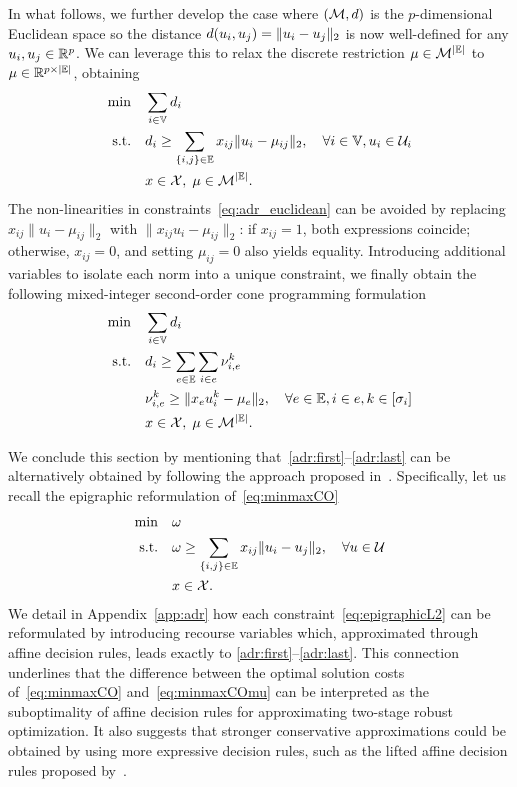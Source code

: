 \documentclass[12pt]{article}
\begin{document}
In what follows, we further develop the case where $(\mathcal{M},d)$ is the $p$-dimensional Euclidean space so the distance $d(u_i,u_j)=\|u_i-u_j\|_2$ is now well-defined for any $u_i,u_j\in \mathbb{R}^p$. We can leverage this to relax the discrete restriction $\mu\in\mathcal{M}^{|\mathbb{E}|}$ to $\mu\in\mathbb{R}^{p\times|\mathbb{E}|}$, obtaining
\begin{align}
\min\quad & \sum_{i\in \mathbb{V}}d_i \\
\mbox{s.t.}\quad & d_i \geq \sum_{\{i,j\}\in \mathbb{E}} x_{ij}\|u_i-\mu_{ij}\|_2, \quad\forall i\in \mathbb{V},u_i\in \mathcal{U}_i\label{eq:adr_euclidean}\\
& x \in \mathcal{X}, \; \mu\in\mathcal{M}^{|\mathbb{E}|}.
\end{align}
The non-linearities in constraints~\eqref{eq:adr_euclidean} can be avoided by replacing $x_{ij}\|u_i-\mu_{ij}\|_2$ with $\|x_{ij} u_i-\mu_{ij}\|_2$: if $x_{ij}=1$, both expressions coincide; otherwise, $x_{ij}=0$, and setting $\mu_{ij}=0$ also yields equality. Introducing additional variables to isolate each norm into a unique constraint, we finally obtain the following mixed-integer second-order cone programming formulation
\begin{align}
\min\quad &  \sum_{i\in \mathbb{V}}d_i \label{adr:first}\\
\mbox{s.t.}\quad &
d_i \geq \sum_{e\in \mathbb{E}}\sum_{i\in e} \nu_{i,e}^k\\
& \nu_{i,e}^k \geq \|x_{e} u_i^k-\mu_{e}\|_2, \quad \forall e\in \mathbb{E}, i\in e, k\in[{\sigma_{i}}]\\
& x \in \mathcal{X},\;  \mu\in\mathcal{M}^{|\mathbb{E}|}.\label{adr:last}
\end{align}

We conclude this section by mentioning that~\eqref{adr:first}--\eqref{adr:last} can be alternatively obtained by following the approach proposed in~\citet{zhen2021robust}. Specifically, let us recall the epigraphic reformulation of~\ref{eq:minmaxCO}
\begin{align}
\min\quad & \omega \label{eq:eculideanfirst}\\
\mbox{s.t.}\quad & \omega \geq \sum_{\{i,j\}\in \mathbb{E}} x_{ij} \|u_i-u_j\|_2, \quad \forall u\in\mathcal{U}\label{eq:epigraphicL2}\\
& x \in \mathcal{X}.\label{eq:eculideanlast}
\end{align}
We detail in Appendix~\ref{app:adr} how each constraint~\eqref{eq:epigraphicL2} can be reformulated by introducing recourse variables which, approximated through affine decision rules, leads exactly to \eqref{adr:first}--\eqref{adr:last}. This connection underlines that the difference between the optimal solution costs of~\ref{eq:minmaxCO} and~\ref{eq:minmaxCOmu} can be interpreted as the suboptimality of affine decision rules for approximating two-stage robust optimization. It also suggests that stronger conservative approximations could be obtained by using more expressive decision rules, such as the lifted affine decision rules proposed by~\cite{de2017tractable}.
\end{document}
